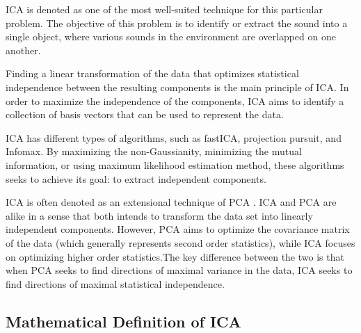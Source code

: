 ICA is denoted as one of the most well-suited technique for this particular problem. The objective of this problem is to identify or extract the sound into a single object, where various sounds in the environment are overlapped on one another. 

Finding a linear transformation of the data that optimizes statistical independence between the resulting components is the main principle of ICA. In order to maximize the independence of the components, ICA aims to identify a collection of basis vectors that can be used to represent the data.

ICA has different types of algorithms, such as fastICA, projection pursuit, and Infomax. By maximizing the non-Gaussianity, minimizing the mutual information, or using maximum likelihood estimation method, these algorithms seeks to achieve its goal: to extract independent components. 

ICA is often denoted as an extensional technique of PCA \cite{Tharwat}. ICA and PCA are alike in a sense that both intends to transform the data set into linearly independent components. However, PCA aims to optimize the covariance matrix of the data (which generally represents second order statistics), while ICA focuses on optimizing higher order statistics.The key difference between the two is that when PCA seeks to find directions of maximal variance in the data, ICA seeks to find directions of maximal statistical independence.


\newpage
\subsection{Mathematical Definition of ICA}


